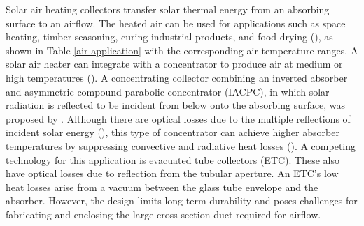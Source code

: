 
Solar air heating collectors transfer solar thermal energy from an absorbing surface to an airflow. The heated air can be used for applications such as space heating, timber seasoning, curing industrial products, and food drying (\cite{Shams2016}), as shown in Table \ref{air-application} with the corresponding air temperature ranges. A solar air heater can integrate with a concentrator to produce air at medium or high temperatures (\cite{Duffie2013}). A concentrating collector combining an inverted absorber and asymmetric compound parabolic concentrator (IACPC), in which solar radiation is reflected to be incident from below onto the absorbing surface, was proposed by \citet{Rabl1976}. Although there are optical losses due to the multiple reflections of incident solar energy (\cite{Kothdiwala1996}), this type of concentrator can achieve higher absorber temperatures by suppressing convective and radiative heat losses (\cite{Kothdiwala1999}). A competing technology for this application is evacuated tube collectors (ETC). These also have optical losses due to reflection from the tubular aperture. An ETC’s low heat losses arise from a vacuum between the glass tube envelope and the absorber. However, the design limits long-term durability and poses challenges for fabricating and enclosing the large cross-section duct required for airflow.

